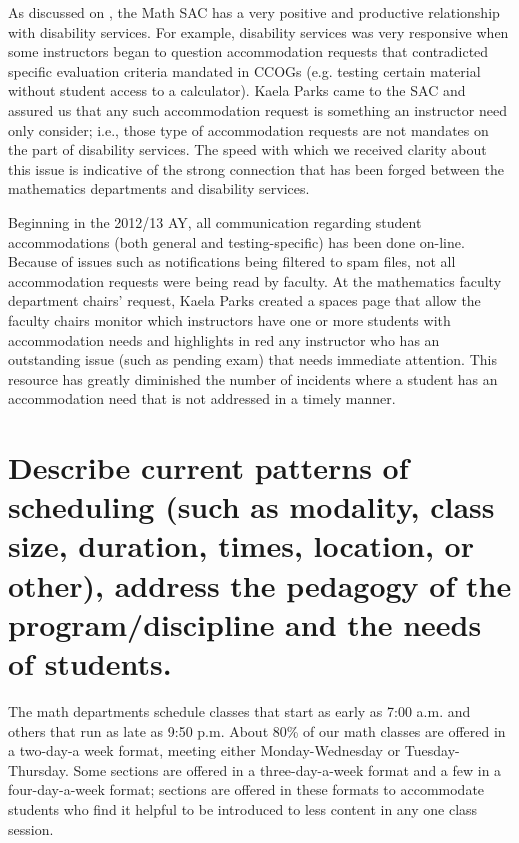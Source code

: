 
As discussed on ,
the Math SAC has a very positive and productive relationship with disability
services.  For example, disability services was very responsive when some
instructors began to question accommodation requests that contradicted specific
evaluation criteria mandated in CCOGs (e.g. testing certain material without
student access to a calculator).  Kaela Parks came to the SAC and assured us
that any such accommodation request is something an instructor need only
consider; i.e., those type of accommodation requests are not mandates on the
part of disability services.  The speed with which we received clarity about
this issue is indicative of the strong connection that has been forged between
the mathematics departments and disability services.

Beginning in the 2012/13 AY, all communication regarding student accommodations
(both general and testing-specific) has been done on-line.
Because of issues such as notifications being filtered to spam files, not all
accommodation requests were being read by faculty.  At the  mathematics faculty
department chairs' request, Kaela Parks created a spaces page that allow the
faculty chairs monitor which instructors have one or more students with
accommodation needs and highlights in red any instructor who has an outstanding
issue (such as pending exam) that needs immediate attention.  This resource has
greatly diminished the number of incidents where a student has an
accommodation need that is not addressed in a timely manner.

\section{Describe current patterns of scheduling (such as modality, class size, duration, times, location, or other),  address the pedagogy of the program/discipline and the needs of students.} 
The math departments schedule classes that start as early as 7:00 a.m. and
others that run as late as 9:50 p.m.  About 80\% of our math classes are offered
in a two-day-a week format, meeting either Monday-Wednesday or
Tuesday-Thursday.  Some sections are offered in a three-day-a-week format and a
few in a four-day-a-week format; sections are offered in these formats to
accommodate students who find it helpful to be introduced to less content in
any one class session.  

